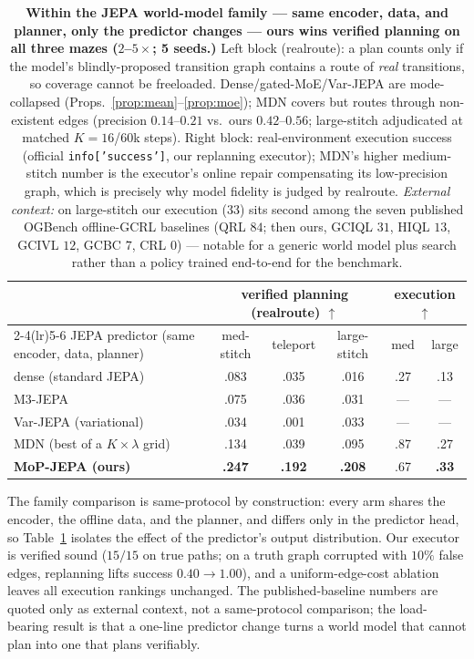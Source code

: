 \documentclass[letterpaper]{article}
\begin{document}
\begin{table}[t]
\centering
\small
\begin{tabular}{@{}lccc|cc@{}}
\toprule
& \multicolumn{3}{c}{\textbf{verified planning (realroute)} $\uparrow$}
& \multicolumn{2}{c}{execution $\uparrow$} \\
\cmidrule(lr){2-4}\cmidrule(lr){5-6}
JEPA predictor (same encoder, data, planner) & med-stitch & teleport & large-stitch & med & large \\
\midrule
dense (standard JEPA) & .083 & .035 & .016 & .27 & .13 \\
M3-JEPA & .075 & .036 & .031 & --- & --- \\
Var-JEPA (variational) & .034 & .001 & .033 & --- & --- \\
MDN (best of a $K\times\lambda$ grid) & .134 & .039 & .095 & .87 & .27 \\
\textbf{MoP-JEPA (ours)} & \textbf{.247} & \textbf{.192} & \textbf{.208} & .67 & \textbf{.33} \\
\bottomrule
\end{tabular}
\caption{\textbf{Within the JEPA world-model family --- same encoder, data, and planner, only the
predictor changes --- ours wins verified planning on all three mazes ($2$--$5\times$; 5 seeds.)}
Left block (realroute): a plan counts only if the model's blindly-proposed transition graph contains a
route of \emph{real} transitions, so coverage cannot be freeloaded. Dense/gated-MoE/Var-JEPA are
mode-collapsed (Props.~\ref{prop:mean}--\ref{prop:moe}); MDN covers but routes through non-existent edges
(precision $0.14$--$0.21$ vs.\ ours $0.42$--$0.56$; large-stitch adjudicated at matched $K{=}16$/$60$k
steps). Right block: real-environment execution success (official \texttt{info['success']}, our
replanning executor); MDN's higher medium-stitch number is the executor's online repair compensating its
low-precision graph, which is precisely why model fidelity is judged by realroute.
\emph{External context:} on large-stitch our execution ($33$) sits second among the seven published
OGBench offline-GCRL baselines \citep{park2025ogbench} (QRL $84$; then ours, GCIQL $31$, HIQL $13$,
GCIVL $12$, GCBC $7$, CRL $0$) --- notable for a generic world model plus search rather than a
policy trained end-to-end for the benchmark.}
\label{tab:exec}
\end{table}

The family comparison is same-protocol by construction: every arm shares the encoder, the offline data,
and the planner, and differs only in the predictor head, so Table~\ref{tab:exec} isolates the effect of
the predictor's output distribution. Our executor is verified sound ($15/15$ on true paths; on a truth
graph corrupted with $10\%$ false edges, replanning lifts success $0.40\to1.00$), and a uniform-edge-cost
ablation leaves all execution rankings unchanged. The published-baseline numbers are quoted only as
external context, not a same-protocol comparison; the load-bearing result is that a one-line predictor
change turns a world model that cannot plan into one that plans verifiably.
\end{document}
